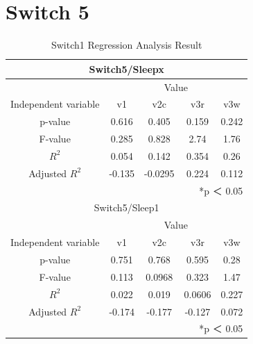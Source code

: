 \documentclass[11pt
  , a4paper
  , article
  , oneside
]{memoir}
\begin{document}
\section{Switch 5}
\begin{table}[h!]
\begin{center}
\begin{tabular}{c|c||c||c||c}
\multicolumn{5}{c}{Switch5/Sleepx}\\ \hline\hline
\multicolumn{1}{c|}{}& \multicolumn{4}{c}{Value}\\
\cline{1-5}
Independent variable & v1 & v2c & v3r & v3w      \\ \hline\hline
p-value & 0.616 & 0.405& 0.159 & 0.242\\ 
F-value & 0.285 & 0.828& 2.74 & 1.76\\ 
$  R^2  $ & 0.054 & 0.142& 0.354 & 0.26\\ 
Adjusted $  R^2  $ & -0.135 & -0.0295& 0.224 & 0.112\\ \hline\hline
\multicolumn{5}{r}{*p ＜ 0.05} \\ 
\multicolumn{5}{c}{Switch5/Sleep1}\\ \hline\hline
\multicolumn{1}{c|}{}& \multicolumn{4}{c}{Value}\\
\cline{1-5}
Independent variable & v1 & v2c & v3r & v3w      \\ \hline\hline
p-value & 0.751 & 0.768 & 0.595 & 0.28\\ 
F-value & 0.113 & 0.0968 & 0.323 & 1.47\\ 
$  R^2  $ & 0.022 & 0.019& 0.0606 & 0.227\\ 
Adjusted $  R^2  $ & -0.174 & -0.177 & -0.127 & 0.072\\ \hline\hline
\multicolumn{5}{r}{*p ＜ 0.05} \\ 
\end{tabular}
\caption{Switch1 Regression Analysis Result }
\end{center}
\end{table} 



\clearpage


\end{document}
